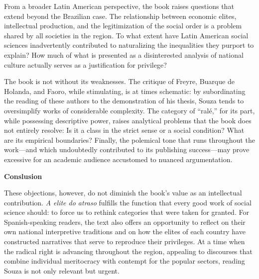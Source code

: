 \documentclass{article}
\begin{document}
From a broader Latin American perspective, the book raises questions that extend beyond the Brazilian case. The relationship between economic elites, intellectual production, and the legitimization of the social order is a problem shared by all societies in the region. To what extent have Latin American social sciences inadvertently contributed to naturalizing the inequalities they purport to explain? How much of what is presented as a disinterested analysis of national culture actually serves as a justification for privilege?

The book is not without its weaknesses. The critique of Freyre, Buarque de Holanda, and Faoro, while stimulating, is at times schematic: by subordinating the reading of these authors to the demonstration of his thesis, Souza tends to oversimplify works of considerable complexity. The category of “ralé,” for its part, while possessing descriptive power, raises analytical problems that the book does not entirely resolve: Is it a class in the strict sense or a social condition? What are its empirical boundaries? Finally, the polemical tone that runs throughout the work—and which undoubtedly contributed to its publishing success—may prove excessive for an academic audience accustomed to nuanced argumentation.

\textbf{Conslusion}

These objections, however, do not diminish the book’s value as an intellectual contribution. \textit{A elite do atraso} fulfills the function that every good work of social science should: to force us to rethink categories that were taken for granted. For Spanish-speaking readers, the text also offers an opportunity to reflect on their own national interpretive traditions and on how the elites of each country have constructed narratives that serve to reproduce their privileges. At a time when the radical right is advancing throughout the region, appealing to discourses that combine individual meritocracy with contempt for the popular sectors, reading Souza is not only relevant but urgent.
\end{document}
